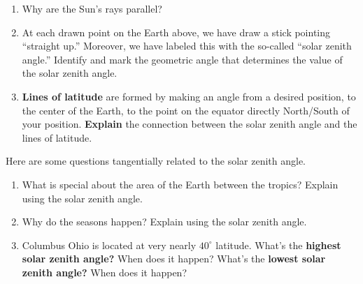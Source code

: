 \documentclass[noauthor,nooutcomes,handout,hints]{ximera}
\begin{document}
\begin{question}
\begin{center}
  \end{center}
  \begin{enumerate}
  \item Why are the Sun's rays parallel?
  \item At each drawn point on the Earth above, we have draw a stick
    pointing ``straight up.'' Moreover, we have labeled this with the
    so-called ``solar zenith angle.'' Identify and mark the geometric angle
    that determines the value of the solar zenith angle.
  \item \textbf{Lines of latitude} are formed by making an angle from
    a desired position, to the center of the Earth, to the point on
    the equator directly North/South of your position. \textbf{Explain}
    the connection between the solar zenith angle and the lines of latitude.
  \end{enumerate}
 
\end{question}
\mynewpage




\begin{question}
  Here are some questions tangentially related to the solar zenith angle.
  \begin{enumerate}
  \item What is special about the area of the Earth between the tropics? Explain using the solar zenith angle.
  \item Why do the seasons happen? Explain using the solar zenith angle.
  \item Columbus Ohio is located at very nearly $40^\circ$
    latitude. What's the \textbf{highest solar zenith angle?} When does it
    happen? What's the \textbf{lowest solar zenith angle?} When does it happen?
  \end{enumerate}
\end{question}
\end{document}
